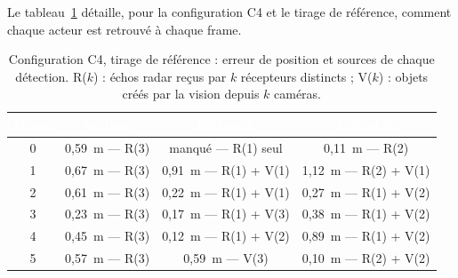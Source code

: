 \documentclass[12pt,a4paper,titlepage]{article}
\newcommand{\hd}[1]{\textcolor{white}{\textbf{#1}}}
\begin{document}
Le tableau~\ref{tab:frames_phase5} détaille, pour la configuration C4 et le tirage de référence, comment chaque acteur est retrouvé à chaque frame.

\begin{table}[H]
    \centering
    \caption{Configuration C4, tirage de référence : erreur de position et sources de chaque détection. R($k$) : échos radar reçus par $k$ récepteurs distincts ; V($k$) : objets créés par la vision depuis $k$ caméras.}
    \label{tab:frames_phase5}
    \begin{tabular}{cccc}
        \toprule
        \rowcolor{tabhead}
        \hd{Frame} & \hd{Voiture} & \hd{Piéton A} & \hd{Piéton B} \\
        \midrule
        0 & 0,59~m --- R(3) & manqué --- R(1) seul & 0,11~m --- R(2) \\
        1 & 0,67~m --- R(3) & 0,91~m --- R(1) + V(1) & 1,12~m --- R(2) + V(1) \\
        2 & 0,61~m --- R(3) & 0,22~m --- R(1) + V(1) & 0,27~m --- R(1) + V(2) \\
        3 & 0,23~m --- R(3) & 0,17~m --- R(1) + V(3) & 0,38~m --- R(1) + V(2) \\
        4 & 0,45~m --- R(3) & 0,12~m --- R(1) + V(2) & 0,89~m --- R(1) + V(2) \\
        5 & 0,57~m --- R(3) & 0,59~m --- V(3) & 0,10~m --- R(2) + V(2) \\
        \bottomrule
    \end{tabular}
\end{table}
\end{document}
